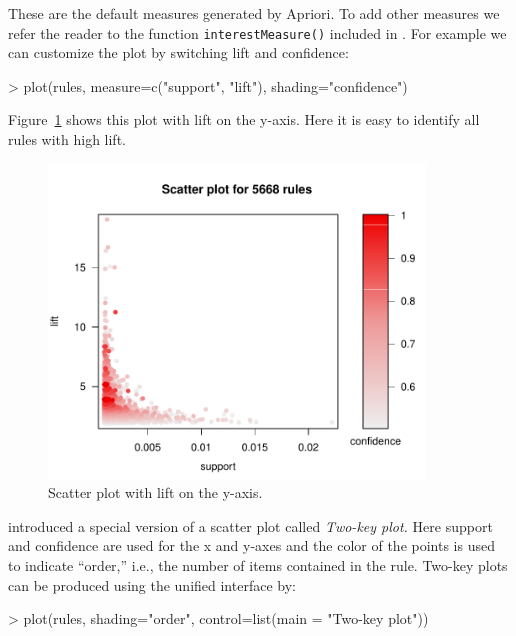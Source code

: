 \documentclass[nojss]{jss}
\newcommand{\func}[1]{\mbox{\texttt{#1()}}}
\begin{document}
These are the default measures generated by Apriori. To add other measures
we refer the reader to the function \func{interestMeasure}
included in .
For example we can customize the plot by switching lift and confidence:

\begin{Schunk}
\begin{Sinput}
> plot(rules, measure=c("support", "lift"), shading="confidence")
\end{Sinput}
\end{Schunk}

Figure~\ref{fig:scatterplot2} shows this plot with lift on the y-axis. Here it
is easy to identify all rules with high lift.

\begin{figure}
\centering
\includegraphics[width=10cm]{arulesViz-scatterplot2}
\caption{Scatter plot with lift on the y-axis.\label{fig:scatterplot2}}
\end{figure}

\cite{arulesViz:Unwin:2001} introduced a special version of a scatter plot
called \emph{Two-key plot.} Here support and confidence are used for the x and
y-axes and the color of the points is used to indicate ``order,'' i.e.,
the number of items contained in the rule. Two-key plots can be produced
using the unified interface by:

\begin{Schunk}
\begin{Sinput}
> plot(rules, shading="order", control=list(main = "Two-key plot"))
\end{Sinput}
\end{Schunk}
\end{document}
